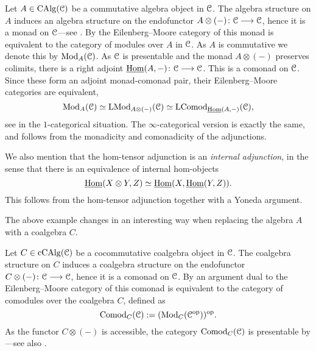 \begin{example}
    \label{ch2:ex:algebra-module-monad}
    Let $A\in \operatorname{CAlg}(\EuScript{C})$ be a commutative algebra object in $\EuScript{C}$. The algebra structure on $A$ induces an algebra structure on the endofunctor $A\otimes(-)\colon\EuScript{C}\longrightarrow \EuScript{C}$, hence it is a monad on $\EuScript{C}$---see \cite[1.15]{christ_2023}. By \cite[1.17]{christ_2023} the Eilenberg--Moore category of this monad is equivalent to the category of modules over $A$ in $\EuScript{C}$. As $A$ is commutative we denote this by $\mathrm{Mod}_A(\EuScript{C})$. As $\EuScript{C}$ is presentable and the monad $A\otimes(-)$ preserves colimits, there is a right adjoint $\operatorname{\underline{Hom}}(A,-)\colon\EuScript{C}\longrightarrow \EuScript{C}$. This is a comonad on $\EuScript{C}$. Since these form an adjoint monad-comonad pair, their Eilenberg--Moore categories are equivalent,
    \[\mathrm{Mod}_A(\EuScript{C})\simeq \mathrm{LMod}_{A\otimes(-)}(\EuScript{C})\simeq \mathrm{LComod}_{\operatorname{\underline{Hom}}(A,-)}(\EuScript{C}),\]
    see \cite[V.8.2]{maclane-moerdijk_1994} in the $1$-categorical situation. The $\infty$-categorical version is exactly the same, and follows from the monadicity and comonadicity of the adjunctions. 
\end{example}

\begin{remark}
    \label{ch2:rm:internal-adjunction}
    We also mention that the hom-tensor adjunction is an \emph{internal adjunction}, in the sense that there is an equivalence of internal hom-objects 
    \[\operatorname{\underline{Hom}}(X\otimes Y, Z) \simeq \operatorname{\underline{Hom}}(X, \operatorname{\underline{Hom}}(Y, Z)).\]
    This follows from the hom-tensor adjunction together with a Yoneda argument. 
\end{remark}


The above example changes in an interesting way when replacing the algebra $A$ with a coalgebra $C$. 

\begin{example}
    \label{ch2:ex:coalgebra-comonad}
    Let $C\in \operatorname{cCAlg}(\EuScript{C})$ be a cocommutative coalgebra object in $\EuScript{C}$. The coalgebra structure on $C$ induces a coalgebra structure on the endofunctor $C\otimes(-)\colon\EuScript{C}\longrightarrow\EuScript{C}$, hence it is a comonad on $\EuScript{C}$. By an argument dual to \cite[1.17]{christ_2023} the Eilenberg--Moore category of this comonad is equivalent to the category of comodules over the coalgebra $C$, defined as 
    \[\mathrm{Comod}_C(\EuScript{C}):= (\mathrm{Mod}_{C}(\EuScript{C}^{\mathrm{op}}))^{\mathrm{op}}.\] 
    As the functor $C\otimes (-)$ is accessible, the category $\mathrm{Comod}_C(\EuScript{C})$ is presentable by \cite[3.8]{ramzi_2024}---see also \cite[2.1.11]{peroux_2020}. 
\end{example}

